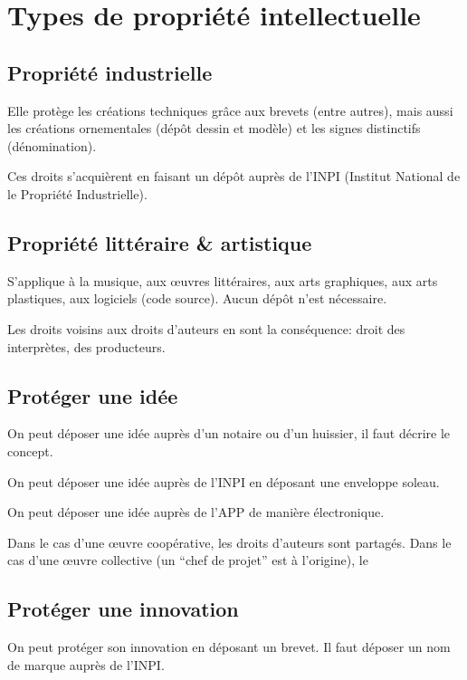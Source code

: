 \documentclass[10pt,a4paper,french]{article}
\begin{document}
\section{Types de propriété intellectuelle}

\subsection{Propriété industrielle}
Elle protège les créations techniques grâce aux brevets (entre autres), mais aussi les créations ornementales (dépôt dessin et modèle) et les signes distinctifs (dénomination).

Ces droits s'acquièrent en faisant un dépôt auprès de l'INPI (Institut National de le Propriété Industrielle).

\subsection{Propriété littéraire \& artistique}
S'applique à la musique, aux œuvres littéraires, aux arts graphiques, aux arts plastiques, aux logiciels (code source). Aucun dépôt n'est nécessaire.

Les droits voisins aux droits d'auteurs en sont la conséquence: droit des interprètes, des producteurs.

\subsection{Protéger une idée}

On peut déposer une idée auprès d'un notaire ou d'un huissier, il faut décrire le concept.

On peut déposer une idée auprès de l'INPI en déposant une enveloppe soleau.

On peut déposer une idée auprès de l'APP de manière électronique.

Dans le cas d'une œuvre coopérative, les droits d'auteurs sont partagés. Dans le cas d'une œuvre collective (un ``chef de projet'' est à l'origine), le 

\subsection{Protéger une innovation}

On peut protéger son innovation en déposant un brevet. Il faut déposer un nom de marque auprès de l'INPI.
\end{document}
